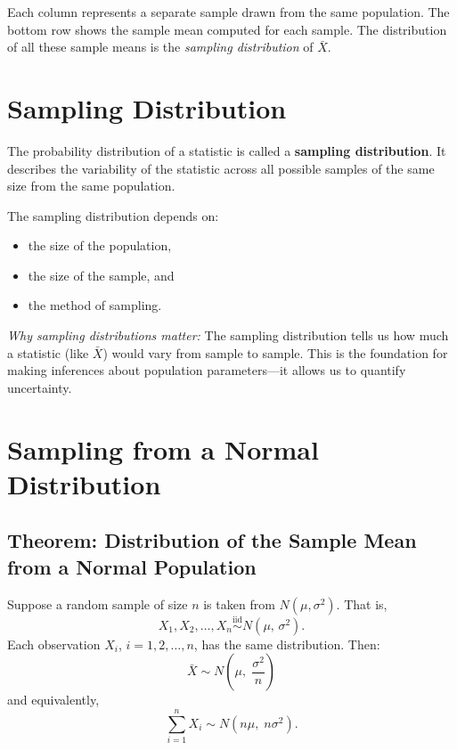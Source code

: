 \documentclass[10pt]{report}
\begin{document}
Each column represents a separate sample drawn from the same population. The bottom row shows the sample mean computed for each sample. The distribution of all these sample means is the \textit{sampling distribution} of $\bar{X}$.

\section{Sampling Distribution}

\begin{tcolorbox}[colback=babyblue!15, colframe=babyblue!60!black, title=Definition: Sampling Distribution]
The probability distribution of a statistic is called a \textbf{sampling distribution}. It describes the variability of the statistic across all possible samples of the same size from the same population.
\end{tcolorbox}

The sampling distribution depends on:
\begin{itemize}
  \item the size of the population,
  \item the size of the sample, and
  \item the method of sampling.
\end{itemize}

\textit{Why sampling distributions matter:} The sampling distribution tells us how much a statistic (like $\bar{X}$) would vary from sample to sample. This is the foundation for making inferences about population parameters---it allows us to quantify uncertainty.

\section{Sampling from a Normal Distribution}

\subsection{Theorem: Distribution of the Sample Mean from a Normal Population}

\begin{tcolorbox}[colback=softpink!15, colframe=softpink!60!black, title=Theorem (Normal Population)]
Suppose a random sample of size $n$ is taken from $N(\mu, \sigma^2)$. That is,
\[
X_1, X_2, \ldots, X_n \overset{\text{iid}}{\sim} N(\mu,\,\sigma^2).
\]
Each observation $X_i$, $i = 1, 2, \ldots, n$, has the same distribution. Then:
\[
\bar{X} \sim N\!\left(\mu,\;\frac{\sigma^2}{n}\right)
\]
and equivalently,
\[
\sum_{i=1}^n X_i \sim N(n\mu,\; n\sigma^2).
\]
\end{tcolorbox}
\end{document}
